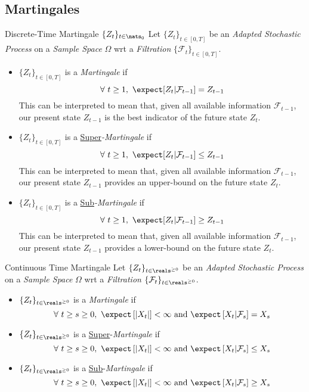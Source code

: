 \documentclass[11pt,a4paper]{article}
\begin{document}
\subsection{Martingales}

  \begin{definition}{Discrete-Time Martingale $\{Z_t\}_{t\in\nats_0}$}
    Let $\{Z_t\}_{t\in[0,T]}$ be an \textit{Adapted Stochastic Process} on a \textit{Sample Space} $\Omega$ wrt a \textit{Filtration} $\{\mathcal{F}_t\}_{t\in[0,T]}$.
    \begin{itemize}
      \item $\{Z_t\}_{t\in[0,T]}$ is a \textit{Martingale} if
      \[ \forall\ t\geq1,\ \expect[Z_t|\mathcal{F}_{t-1}]=Z_{t-1} \]
      This can be interpreted to mean that, given all available information $\mathcal{F}_{t-1}$, our present state $Z_{t-1}$ is the best indicator of the future state $Z_t$.
      \item $\{Z_t\}_{t\in[0,T]}$ is a \underline{Super}\textit{-Martingale} if
      \[ \forall\ t\geq1,\ \expect[Z_t|\mathcal{F}_{t-1}]\leq Z_{t-1} \]
      This can be interpreted to mean that, given all available information $\mathcal{F}_{t-1}$, our present state $Z_{t-1}$ provides an upper-bound on the future state $Z_t$.
      \item $\{Z_t\}_{t\in[0,T]}$ is a \underline{Sub}\textit{-Martingale} if
      \[ \forall\ t\geq1,\ \expect[Z_t|\mathcal{F}_{t-1}]\geq Z_{t-1} \]
      This can be interpreted to mean that, given all available information $\mathcal{F}_{t-1}$, our present state $Z_{t-1}$ provides a lower-bound on the future state $Z_t$.
    \end{itemize}
  \end{definition}

  \begin{definition}{Continuous Time Martingale}
    Let $\{Z_t\}_{t\in\reals^{\geq0}}$ be an \textit{Adapted Stochastic Process} on a \textit{Sample Space} $\Omega$ wrt a \textit{Filtration} $\{\mathcal{F}_t\}_{t\in\reals^{\geq0}}$.
    \begin{itemize}
      \item $\{Z_t\}_{t\in\reals^{\geq0}}$ is a \textit{Martingale} if
      \[ \forall\ t\geq s\geq0,\ \expect\left[|X_t|\right]<\infty\text{ and }\expect\left[X_t|\mathcal{F}_s\right]=X_s \]
      \item $\{Z_t\}_{t\in\reals^{\geq0}}$ is a \underline{Super}-\textit{Martingale} if
      \[ \forall\ t\geq s\geq0,\ \expect\left[|X_t|\right]<\infty\text{ and }\expect\left[X_t|\mathcal{F}_s\right]\leq X_s \]
      \item $\{Z_t\}_{t\in\reals^{\geq0}}$ is a \underline{Sub}-\textit{Martingale} if
      \[ \forall\ t\geq s\geq0,\ \expect\left[|X_t|\right]<\infty\text{ and }\expect\left[X_t|\mathcal{F}_s\right]\geq X_s \]
    \end{itemize}
  \end{definition}
\end{document}
